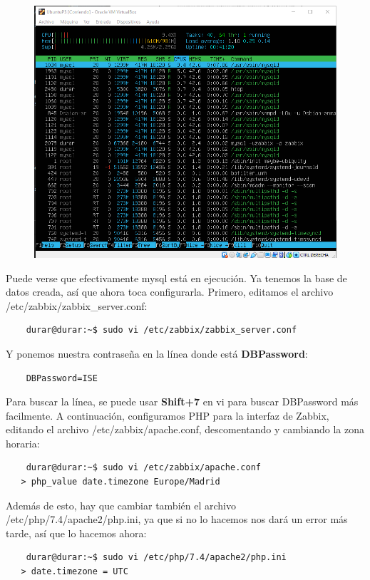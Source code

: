 \documentclass[a4paper]{article}
\begin{document}
\begin{figure}
    \centering
    \includegraphics[width=1.0\textwidth]{htop de mysql.png}
\end{figure}
\newpage
Puede verse que efectivamente mysql está en ejecución.\newline
Ya tenemos la base de datos creada, así que ahora toca configurarla.
Primero, editamos el archivo /etc/zabbix/zabbix\_server.conf:
\begin{lstlisting}
    durar@durar:~$ sudo vi /etc/zabbix/zabbix_server.conf
\end{lstlisting}
Y ponemos nuestra contraseña en la línea donde está \textbf{DBPassword}: 
\begin{lstlisting}
    DBPassword=ISE
\end{lstlisting}
Para buscar la línea, se puede usar \textbf{Shift+7} en vi para buscar DBPassword más 
facilmente.\newline
A continuación, configuramos PHP para la interfaz de Zabbix, editando el archivo 
/etc/zabbix/apache.conf, descomentando y cambiando la zona horaria:
\begin{lstlisting}
    durar@durar:~$ sudo vi /etc/zabbix/apache.conf
   > php_value date.timezone Europe/Madrid
\end{lstlisting}
Además de esto, hay que cambiar también el archivo /etc/php/7.4/apache2/php.ini,
ya que si no lo hacemos nos dará un error más tarde, así que lo hacemos ahora:
\begin{lstlisting}
    durar@durar:~$ sudo vi /etc/php/7.4/apache2/php.ini
   > date.timezone = UTC
\end{lstlisting}
\end{document}

